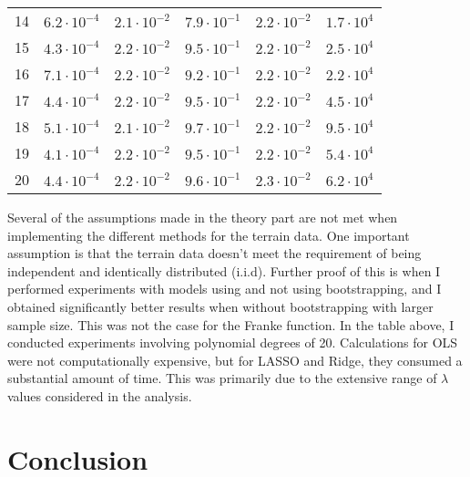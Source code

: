 \documentclass[a4paper,12pt]{article}
\begin{document}
\begin{table}[H]
\begin{tabular}{l l l l l l}
14&$6.2\cdot 10^{-4}$&$2.1\cdot 10^{-2}$ &$7.9\cdot 10^{-1}$ &$2.2\cdot 10^{-2}$&$1.7\cdot 10^{4}  $ \\
15&$4.3\cdot 10^{-4}$&$2.2\cdot 10^{-2}$ &$9.5\cdot 10^{-1}$ &$2.2\cdot 10^{-2}$&$2.5\cdot 10^{4}  $ \\
16&$7.1\cdot 10^{-4}$&$2.2\cdot 10^{-2}$ &$9.2\cdot 10^{-1}$ &$2.2\cdot 10^{-2}$&$2.2\cdot 10^{4}  $ \\
17&$4.4\cdot 10^{-4}$&$2.2\cdot 10^{-2}$ &$9.5\cdot 10^{-1}$ &$2.2\cdot 10^{-2}$&$4.5\cdot 10^{4}  $ \\
18&$5.1\cdot 10^{-4}$&$2.1\cdot 10^{-2}$ &$9.7\cdot 10^{-1}$ &$2.2\cdot 10^{-2}$&$9.5\cdot 10^{4}  $ \\
19&$4.1\cdot 10^{-4}$&$2.2\cdot 10^{-2} $&$9.5\cdot 10^{-1} $&$2.2\cdot 10^{-2} $&$5.4\cdot 10^{4} $ \\ 
20&$4.4\cdot 10^{-4}$&$2.2\cdot 10^{-2}$ &$9.6\cdot 10^{-1}$ &$2.3\cdot 10^{-2}$&$6.2\cdot 10^{4}  $ \\ [1ex] 
\hline\hline
\end{tabular}
\end{table}
     


Several of the assumptions made in the theory part are not met when implementing the different methods for the terrain data. One important assumption is that the terrain data doesn't meet the requirement of being independent and identically distributed (i.i.d). Further proof of this is when I performed experiments with models using and not using bootstrapping, and  I obtained significantly better results when without bootstrapping with larger sample size. This was not the case for the Franke function. In the table above, I conducted experiments involving polynomial degrees of 20. Calculations for OLS were not computationally expensive, but for LASSO and Ridge, they consumed a substantial amount of time. This was primarily due to the extensive range of $\lambda$ values considered in the analysis.




\cleardoublepage

\section{Conclusion}

\noindent
\end{document}
